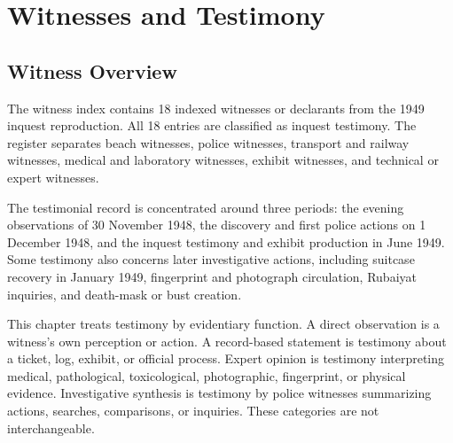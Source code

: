 \chapter{Witnesses and Testimony}
\label{chap:witnesses-and-testimony}


\section{Witness Overview}

The witness index contains 18 indexed witnesses or declarants from the 1949 inquest reproduction. All 18 entries are classified as inquest testimony. The register separates beach witnesses, police witnesses, transport and railway witnesses, medical and laboratory witnesses, exhibit witnesses, and technical or expert witnesses.

The testimonial record is concentrated around three periods: the evening observations of 30 November 1948, the discovery and first police actions on 1 December 1948, and the inquest testimony and exhibit production in June 1949. Some testimony also concerns later investigative actions, including suitcase recovery in January 1949, fingerprint and photograph circulation, Rubaiyat inquiries, and death-mask or bust creation.

This chapter treats testimony by evidentiary function. A direct observation is a witness's own perception or action. A record-based statement is testimony about a ticket, log, exhibit, or official process. Expert opinion is testimony interpreting medical, pathological, toxicological, photographic, fingerprint, or physical evidence. Investigative synthesis is testimony by police witnesses summarizing actions, searches, comparisons, or inquiries. These categories are not interchangeable.

